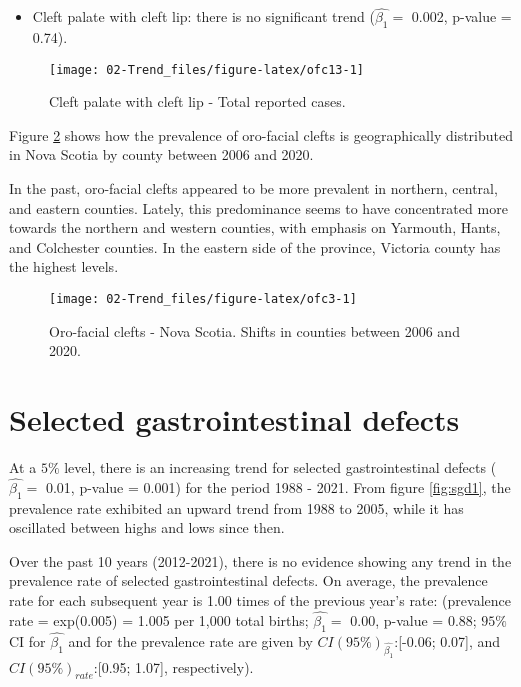 \documentclass[
]{krantz}
\providecommand{\tightlist}{%
  \setlength{\itemsep}{0pt}\setlength{\parskip}{0pt}}
\begin{document}
\begin{itemize}
\tightlist
\item
  Cleft palate with cleft lip: there is no significant trend (\(\hat{\beta_{1}} =\) 0.002, p-value = 0.74).
\end{itemize}

\begin{figure}[h]

{\centering \texttt{[image: 02-Trend\_files/figure-latex/ofc13-1]} 

}

\caption{Cleft palate with cleft lip - Total reported cases.}\label{fig:ofc13}
\end{figure}

Figure \ref{fig:ofc3} shows how the prevalence of oro-facial clefts is geographically distributed in Nova Scotia by county between 2006 and 2020.

In the past, oro-facial clefts appeared to be more prevalent in northern, central, and eastern counties. Lately, this predominance seems to have concentrated more towards the northern and western counties, with emphasis on Yarmouth, Hants, and Colchester counties. In the eastern side of the province, Victoria county has the highest levels.

\begin{figure}[h]

{\centering \texttt{[image: 02-Trend\_files/figure-latex/ofc3-1]} 

}

\caption{Oro-facial clefts - Nova Scotia. Shifts in counties between 2006 and 2020.}\label{fig:ofc3}
\end{figure}

\clearpage

\hypertarget{section37}{%
\section{Selected gastrointestinal defects}\label{section37}}

At a \(5\%\) level, there is an increasing trend for selected gastrointestinal defects (\(\hat{\beta_{1}} =\) 0.01, p-value = 0.001) for the period 1988 - 2021. From figure \ref{fig:sgd1}, the prevalence rate exhibited an upward trend from 1988 to 2005, while it has oscillated between highs and lows since then.

Over the past 10 years (2012-2021), there is no evidence showing any trend in the prevalence rate of selected gastrointestinal defects. On average, the prevalence rate for each subsequent year is 1.00 times of the previous year's rate: (prevalence rate = exp(0.005) = 1.005 per 1,000 total births; \(\hat{\beta_{1}} =\) 0.00, p-value = 0.88; \(95\%\) CI for \(\hat{\beta_{1}}\) and for the prevalence rate are given by \(CI(95\%)_{\hat{\beta_{1}}}\):{[}-0.06; 0.07{]}, and \(CI(95\%)_{rate}\):{[}0.95; 1.07{]}, respectively).
\end{document}
